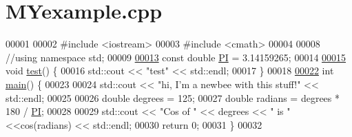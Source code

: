 \hypertarget{MYexample_8cpp_source}{\section{M\-Yexample.\-cpp}
}

\begin{DoxyCode}
00001 
00002 \textcolor{preprocessor}{#include <iostream>}
00003 \textcolor{preprocessor}{#include <cmath>}
00004 
00008 \textcolor{comment}{//using namespace std;}
00009 
\hypertarget{MYexample_8cpp_source_l00013}{}\hyperlink{MYexample_8cpp_a952eac791b596a61bba0a133a3bb439f}{00013} \textcolor{keyword}{const} \textcolor{keywordtype}{double} \hyperlink{MYexample_8cpp_a952eac791b596a61bba0a133a3bb439f}{PI} = 3.14159265;
00014 
\hypertarget{MYexample_8cpp_source_l00015}{}\hyperlink{MYexample_8cpp_ae1a3968e7947464bee7714f6d43b7002}{00015} \textcolor{keywordtype}{void} \hyperlink{MYexample_8cpp_ae1a3968e7947464bee7714f6d43b7002}{test}() \{
00016   std::cout << \textcolor{stringliteral}{"test"} << std::endl;
00017 \}
00018 
\hypertarget{MYexample_8cpp_source_l00022}{}\hyperlink{MYexample_8cpp_ae66f6b31b5ad750f1fe042a706a4e3d4}{00022} \textcolor{keywordtype}{int} \hyperlink{MYexample_8cpp_ae66f6b31b5ad750f1fe042a706a4e3d4}{main}() \{
00023 
00024   std::cout << \textcolor{stringliteral}{"hi, I'm a newbee with this stuff!"} << std::endl;
00025 
00026     \textcolor{keywordtype}{double} degrees = 125;
00027     \textcolor{keywordtype}{double} radians = degrees * 180 / \hyperlink{MYexample_8cpp_a952eac791b596a61bba0a133a3bb439f}{PI};
00028 
00029     std::cout << \textcolor{stringliteral}{"Cos of "} << degrees << \textcolor{stringliteral}{" is "} <<cos(radians) << std::endl;
00030     \textcolor{keywordflow}{return} 0;
00031 \}
00032 
\end{DoxyCode}
